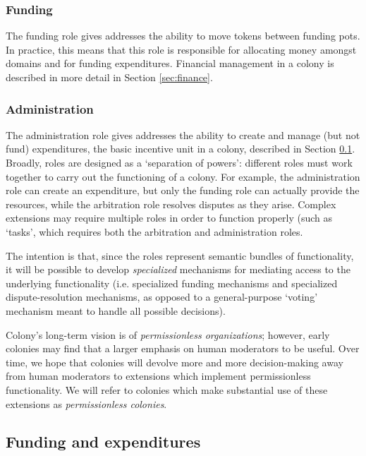 \subsubsection*{Funding}

The funding role gives addresses the ability to move tokens between funding pots. In practice, this means that this role is responsible for allocating money amongst domains and for funding expenditures. Financial management in a colony is described in more detail in Section \ref{sec:finance}.

\subsubsection*{Administration}

The administration role gives addresses the ability to create and manage (but not fund) expenditures, the basic incentive unit in a colony, described in Section \ref{sec:expenditures}. \\

Broadly, roles are designed as a `separation of powers': different roles must work together to carry out the functioning of a colony. For example, the administration role can create an expenditure, but only the funding role can actually provide the resources, while the arbitration role resolves disputes as they arise. Complex extensions may require multiple roles in order to function properly (such as `tasks', which requires both the arbitration and administration roles.

The intention is that, since the roles represent semantic bundles of functionality, it will be possible to develop \textit{specialized} mechanisms for mediating access to the underlying functionality (i.e. specialized funding mechanisms and specialized dispute-resolution mechanisms, as opposed to a general-purpose `voting' mechanism meant to handle all possible decisions).

Colony's long-term vision is of \textit{permissionless organizations}; however, early colonies may find that a larger emphasis on human moderators to be useful. Over time, we hope that colonies will devolve more and more decision-making away from human moderators to extensions which implement permissionless functionality. We will refer to colonies which make substantial use of these extensions as \textit{permissionless colonies}.

\subsection{Funding and expenditures}\label{sec:expenditures}\label{sec:finance}

